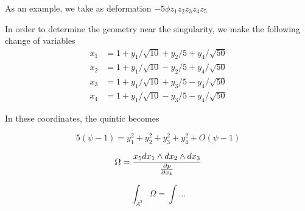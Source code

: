 As an example, we take as deformation $-5\phi z_1 z_2 z_3 z_4 z_5$




In order to determine the geometry near the singularity, we make the following change of 
variables
\begin{equation}
  \begin{aligned}
  x_1 &= 1 + y_1/\sqrt{10} + y_2/5 + y_4/\sqrt{50}\\
  x_2 &= 1 + y_1/\sqrt{10} - y_2/5 + y_4/\sqrt{50}\\
  x_3 &= 1 + y_1/\sqrt{10} + y_3/5 - y_4/\sqrt{50}\\
  x_4 &= 1 + y_1/\sqrt{10} - y_3/5 - y_4/\sqrt{50}
  \end{aligned}
\end{equation}

In these coordinates, the quintic becomes

\begin{equation}
  5(\psi -1 ) =  y_1^2 + y_2^2 + y_3^2 + y_4^2 + O( \psi -1 )
\end{equation}






\begin{equation}
  \Omega = \frac{x_5 dx_1 \wedge dx_2\wedge dx_3}{\pdv{p}{x_4}}
\end{equation}


\begin{equation}
  \int_{A^2} \Omega = \int  \dots
\end{equation}








